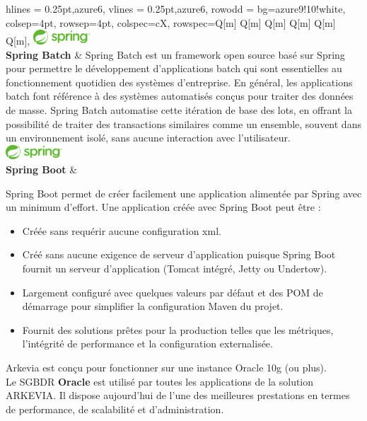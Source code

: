 \begin{longtblr}[caption={Technologies utilisées pour les solutions back-end}]{
    hlines = {0.25pt,azure6},
    vlines = {0.25pt,azure6},
    row{odd} = {bg=azure9!10!white},
    colsep=4pt,
    rowsep=4pt,
	colspec={cX},
    rowspec={Q[m] Q[m] Q[m] Q[m] Q[m] Q[m]},
}
{
\includegraphics[height=5.5mm]{images/sec5/spring.pdf}\\\textbf{Spring Batch}
}
& 
Spring Batch est un framework open source basé sur Spring pour permettre le développement d'applications batch qui sont essentielles au fonctionnement quotidien des systèmes d'entreprise. En général, les applications batch font référence à des systèmes automatisés conçus pour traiter des données de masse.
Spring Batch automatise cette itération de base des lots, en offrant la possibilité de traiter des transactions similaires comme un ensemble, souvent dans un environnement isolé, sans aucune interaction avec l'utilisateur.
\\

 {\includegraphics[height=5.5mm]{images/sec5/spring.pdf}
 \\\textbf{Spring Boot}
 }
&  
\begin{minipage}{\linewidth}
Spring Boot permet de créer facilement une application alimentée par Spring avec un minimum d'effort. Une application créée avec Spring Boot peut être :
\raggedright
\begin{itemize}[leftmargin=*]
\item Créée sans requérir aucune configuration xml.
\item Créé sans aucune exigence de serveur d'application puisque Spring Boot fournit un serveur d'application (Tomcat intégré, Jetty ou Undertow).
\item Largement configuré avec quelques valeurs par défaut et des POM de démarrage pour simplifier la configuration Maven du projet.
\item Fournit des solutions prêtes pour la production telles que les métriques, l'intégrité de performance et la configuration externalisée.
\end{itemize}
\end{minipage}
\end{longtblr}
Arkevia est conçu pour fonctionner sur une instance Oracle 10g  (ou plus).\\
Le SGBDR \textbf{Oracle} est utilisé par toutes les applications de la solution ARKEVIA. Il dispose aujourd'hui de l'une des meilleures prestations en termes de performance, de scalabilité et d'administration.
